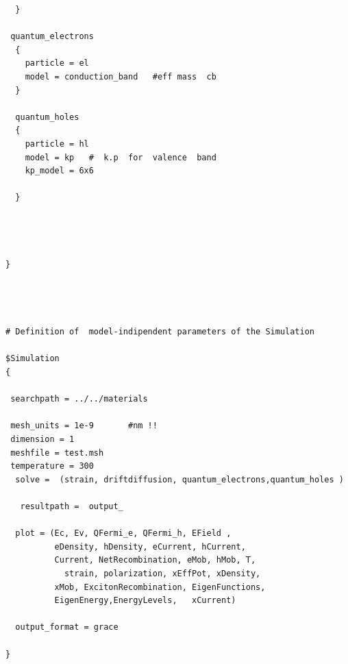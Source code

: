 \begin{verbatim}
  }
   
 quantum_electrons 
  {
    particle = el
    model = conduction_band   #eff mass  cb 
  }

  quantum_holes
  {
    particle = hl
    model = kp   #  k.p  for  valence  band
    kp_model = 6x6

  }




}




# Definition of  model-indipendent parameters of the Simulation

$Simulation
{

 searchpath = ../../materials 
     
 mesh_units = 1e-9       #nm !!
 dimension = 1
 meshfile = test.msh
 temperature = 300
  solve =  (strain, driftdiffusion, quantum_electrons,quantum_holes )

   resultpath =  output_  
 
  plot = (Ec, Ev, QFermi_e, QFermi_h, EField ,
          eDensity, hDensity, eCurrent, hCurrent,
          Current, NetRecombination, eMob, hMob, T, 
            strain, polarization, xEffPot, xDensity,
          xMob, ExcitonRecombination, EigenFunctions, 
          EigenEnergy,EnergyLevels,   xCurrent)
 
  output_format = grace

}








\end{verbatim}








